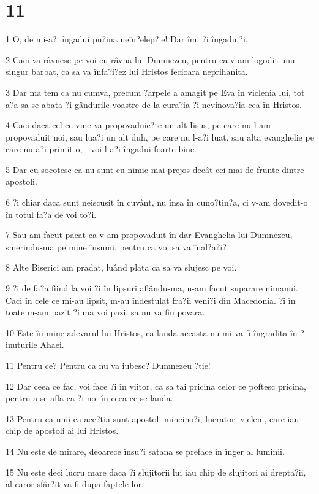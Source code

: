\chapter{11}

\par 1 O, de mi-a?i îngadui pu?ina neîn?elep?ie! Dar îmi ?i îngadui?i,
\par 2 Caci va râvnesc pe voi cu râvna lui Dumnezeu, pentru ca v-am logodit unui singur barbat, ca sa va înfa?i?ez lui Hristos fecioara neprihanita.
\par 3 Dar ma tem ca nu cumva, precum ?arpele a amagit pe Eva în viclenia lui, tot a?a sa se abata ?i gândurile voastre de la cura?ia ?i nevinova?ia cea în Hristos.
\par 4 Caci daca cel ce vine va propovaduie?te un alt Iisus, pe care nu l-am propovaduit noi, sau lua?i un alt duh, pe care nu l-a?i luat, sau alta evanghelie pe care nu a?i primit-o, - voi l-a?i îngadui foarte bine.
\par 5 Dar eu socotesc ca nu sunt cu nimic mai prejos decât cei mai de frunte dintre apostoli.
\par 6 ?i chiar daca sunt neiscusit în cuvânt, nu însa în cuno?tin?a, ci v-am dovedit-o în totul fa?a de voi to?i.
\par 7 Sau am facut pacat ca v-am propovaduit în dar Evanghelia lui Dumnezeu, smerindu-ma pe mine însumi, pentru ca voi sa va înal?a?i?
\par 8 Alte Biserici am pradat, luând plata ca sa va slujesc pe voi.
\par 9 ?i de fa?a fiind la voi ?i în lipsuri aflându-ma, n-am facut suparare nimanui. Caci în cele ce mi-au lipsit, m-au îndestulat fra?ii veni?i din Macedonia. ?i în toate m-am pazit ?i ma voi pazi, sa nu va fiu povara.
\par 10 Este în mine adevarul lui Hristos, ca lauda aceasta nu-mi va fi îngradita în ?inuturile Ahaei.
\par 11 Pentru ce? Pentru ca nu va iubesc? Dumnezeu ?tie!
\par 12 Dar ceea ce fac, voi face ?i în viitor, ca sa tai pricina celor ce poftesc pricina, pentru a se afla ca ?i noi în ceea ce se lauda.
\par 13 Pentru ca unii ca ace?tia sunt apostoli mincino?i, lucratori vicleni, care iau chip de apostoli ai lui Hristos.
\par 14 Nu este de mirare, deoarece însu?i satana se preface în înger al luminii.
\par 15 Nu este deci lucru mare daca ?i slujitorii lui iau chip de slujitori ai drepta?ii, al caror sfâr?it va fi dupa faptele lor.
